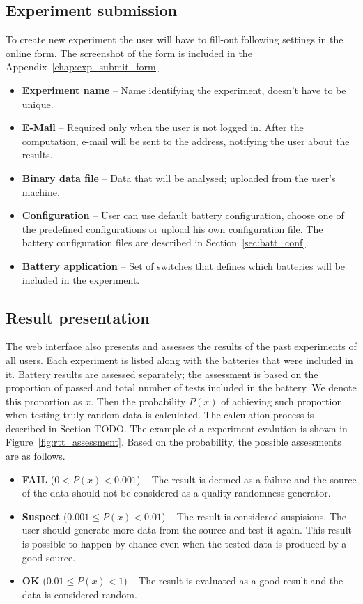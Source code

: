 \documentclass[
  digital,  	%
  color,		%
  oneside,   	%
  12pt,
  nocover,
  notable,
  nolof,
  nolot,
]{fithesis3}
\begin{document}
\subsection*{Experiment submission}
To create new experiment the user  will have to fill-out following settings in the online form. The screenshot of the form is included in the Appendix~\ref{chap:exp_submit_form}.

\begin{itemize}
\item \textbf{Experiment name} -- Name identifying the experiment, doesn't have to be unique.
\item \textbf{E-Mail} -- Required only when the user is not logged in. After the computation, e-mail will be sent to the address, notifying the user about the results.
\item \textbf{Binary data file} -- Data that will be analysed; uploaded from the user's machine.
\item \textbf{Configuration} -- User can use default battery configuration, choose one of the predefined configurations or upload his own configuration file. The battery configuration files are described in Section~\ref{sec:batt_conf}.
\item \textbf{Battery application} -- Set of switches that defines which batteries will be included in the experiment.
\end{itemize}

\subsection*{Result presentation}
The web interface also presents and assesses the results of the past experiments of all users. Each experiment is listed along with the batteries that were included in it. Battery results are assessed separately; the assessment is based on the proportion of passed and total number of tests included in the battery. We denote this proportion as $x$. Then the probability $P(x)$ of achieving such proportion when testing truly random data is calculated. The calculation process is described in Section TODO. The example of a experiment evalution is shown in Figure~\ref{fig:rtt_assessment}. Based on the probability, the possible assessments are as follows.

\begin{itemize}
\item \textbf{FAIL} ($0 < P(x) < 0.001$) -- The result is deemed as a failure and the source of the data should not be considered as a quality randomness generator.
\item \textbf{Suspect} ($0.001 \leq P(x) < 0.01$) -- The result is considered suspisious. The user should generate more data from the source and test it again. This result is possible to happen by chance even when the tested data is produced by a good source.
\item \textbf{OK} ($0.01 \leq P(x) < 1$) -- The result is evaluated as a good result and the data is considered random.
\end{itemize}
\end{document}
